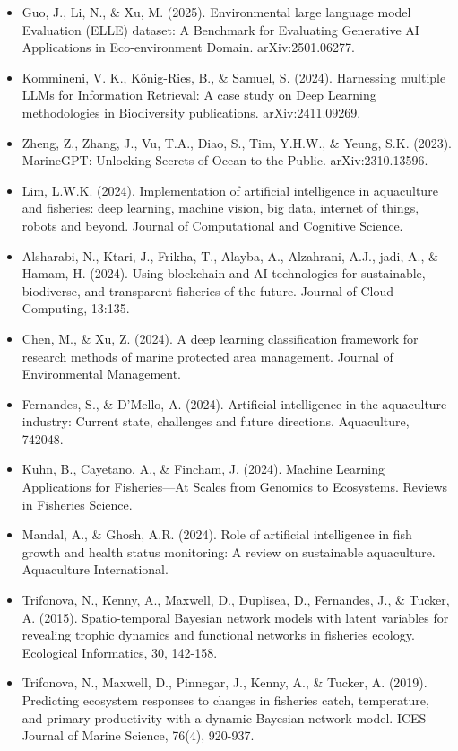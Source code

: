 \begin{itemize}
\item Guo, J., Li, N., \& Xu, M. (2025). Environmental large language model Evaluation (ELLE) dataset: A Benchmark for Evaluating Generative AI Applications in Eco-environment Domain. arXiv:2501.06277.

\item Kommineni, V. K., König-Ries, B., \& Samuel, S. (2024). Harnessing multiple LLMs for Information Retrieval: A case study on Deep Learning methodologies in Biodiversity publications. arXiv:2411.09269.

\item Zheng, Z., Zhang, J., Vu, T.A., Diao, S., Tim, Y.H.W., \& Yeung, S.K. (2023). MarineGPT: Unlocking Secrets of Ocean to the Public. arXiv:2310.13596.

\item Lim, L.W.K. (2024). Implementation of artificial intelligence in aquaculture and fisheries: deep learning, machine vision, big data, internet of things, robots and beyond. Journal of Computational and Cognitive Science.

\item Alsharabi, N., Ktari, J., Frikha, T., Alayba, A., Alzahrani, A.J., jadi, A., \& Hamam, H. (2024). Using blockchain and AI technologies for sustainable, biodiverse, and transparent fisheries of the future. Journal of Cloud Computing, 13:135.

\item Chen, M., \& Xu, Z. (2024). A deep learning classification framework for research methods of marine protected area management. Journal of Environmental Management.

\item Fernandes, S., \& D'Mello, A. (2024). Artificial intelligence in the aquaculture industry: Current state, challenges and future directions. Aquaculture, 742048.

\item Kuhn, B., Cayetano, A., \& Fincham, J. (2024). Machine Learning Applications for Fisheries—At Scales from Genomics to Ecosystems. Reviews in Fisheries Science.

\item Mandal, A., \& Ghosh, A.R. (2024). Role of artificial intelligence in fish growth and health status monitoring: A review on sustainable aquaculture. Aquaculture International.

\item Trifonova, N., Kenny, A., Maxwell, D., Duplisea, D., Fernandes, J., & Tucker, A. (2015). Spatio-temporal Bayesian network models with latent variables for revealing trophic dynamics and functional networks in fisheries ecology. Ecological Informatics, 30, 142-158.

\item Trifonova, N., Maxwell, D., Pinnegar, J., Kenny, A., & Tucker, A. (2019). Predicting ecosystem responses to changes in fisheries catch, temperature, and primary productivity with a dynamic Bayesian network model. ICES Journal of Marine Science, 76(4), 920-937.
\end{itemize}

